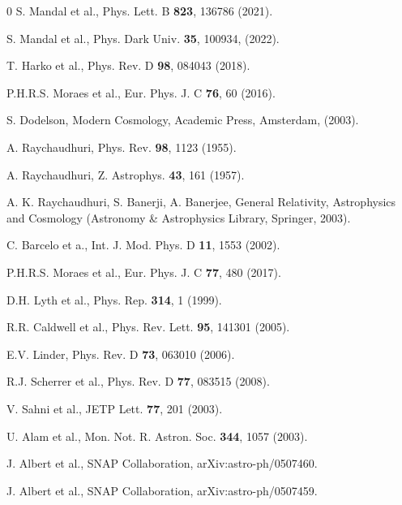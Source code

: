 \documentclass[showpacs,aps,amssymb,preprintnumbers,prd,amsmath,floatfix]{revtex4}
\begin{document}
\begin{thebibliography}{0}
S. Mandal et al., Phys. Lett. B \textbf{823}, 136786 (2021).

S. Mandal et al., Phys. Dark Univ. \textbf{35}, 100934, (2022).

T. Harko et al., Phys. Rev. D \textbf{98}, 084043 (2018).

P.H.R.S. Moraes et al., Eur. Phys. J. C \textbf{76}, 60 (2016).

S. Dodelson, Modern Cosmology, Academic Press, Amsterdam, (2003).

A. Raychaudhuri, Phys. Rev. \textbf{98}, 1123 (1955).

A. Raychaudhuri, Z. Astrophys. \textbf{43}, 161 (1957).

A. K. Raychaudhuri, S. Banerji, A. Banerjee, General Relativity,
Astrophysics and Cosmology (Astronomy \& Astrophysics Library, Springer, 2003).

C. Barcelo et a., Int. J. Mod. Phys. D \textbf{11}, 1553 (2002).

P.H.R.S. Moraes et al., Eur. Phys. J. C \textbf{77}, 480 (2017).

D.H. Lyth et al., Phys. Rep. \textbf{314}, 1 (1999).

R.R. Caldwell et al., Phys. Rev. Lett. \textbf{95}, 141301 (2005). 

E.V. Linder, Phys. Rev. D \textbf{73}, 063010 (2006). 

R.J. Scherrer et al., Phys. Rev. D \textbf{77}, 083515 (2008).

V. Sahni et al., JETP Lett. \textbf{77}, 201 (2003).

U. Alam et al., Mon. Not. R. Astron. Soc. \textbf{344}, 1057 (2003).

J. Albert et al., SNAP Collaboration, arXiv:astro-ph/0507460.

J. Albert et al., SNAP Collaboration, arXiv:astro-ph/0507459.


\end{thebibliography}
\end{document}
